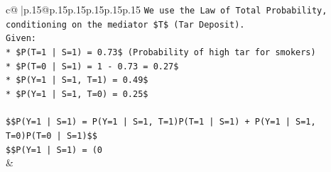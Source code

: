 \documentclass{article}
\begin{document}
{\begin{supertabular}{c@{$\;$}|p{.15\linewidth}@{}p{.15\linewidth}p{.15\linewidth}p{.15\linewidth}p{.15\linewidth}p{.15\linewidth}}
{{{\texttt{We use the Law of Total Probability, conditioning on the mediator \$T\$ (Tar Deposit).} \\
\texttt{Given:} \\
\texttt{*   \$P(T=1 | S=1) = 0.73\$ (Probability of high tar for smokers)} \\
\texttt{*   \$P(T=0 | S=1) = 1 {-} 0.73 = 0.27\$} \\
\texttt{*   \$P(Y=1 | S=1, T=1) = 0.49\$} \\
\texttt{*   \$P(Y=1 | S=1, T=0) = 0.25\$} \\
\\ 
\texttt{\$\$P(Y=1 | S=1) = P(Y=1 | S=1, T=1)P(T=1 | S=1) + P(Y=1 | S=1, T=0)P(T=0 | S=1)\$\$} \\
\texttt{\$\$P(Y=1 | S=1) = (0} \\
            }
        }
    }
    & \\ \\


\end{supertabular}}
\end{document}
